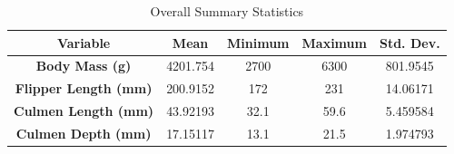 \documentclass[12pt]{article}
\begin{document}
\begin{table}[H]
  \centering
  \begin{tabular}{|| c | c | c | c | c ||}
    \hline
    \textbf{Variable} & \textbf{Mean}
    & \textbf{Minimum}
    & \textbf{Maximum} & \textbf{Std. Dev.} \\[0.5ex]
    \hline\hline
    \textbf{Body Mass (g)} & 4201.754 & 2700 & 6300 & 801.9545 \\
    \textbf{Flipper Length (mm)} & 200.9152 & 172 & 231 & 14.06171 \\
    \textbf{Culmen Length (mm)} & 43.92193 & 32.1 & 59.6 & 5.459584 \\
    \textbf{Culmen Depth (mm)} & 17.15117 & 13.1 & 21.5 & 1.974793 \\
    \hline
  \end{tabular}
  \caption{Overall Summary Statistics}
\end{table}
\end{document}
